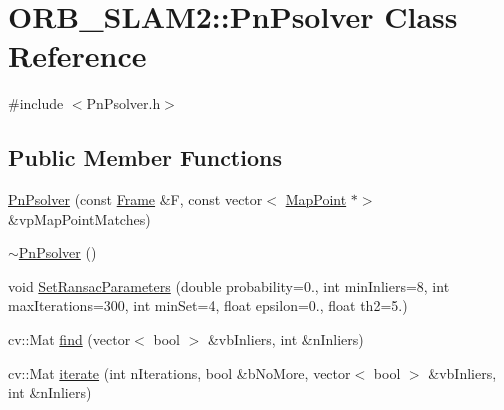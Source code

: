 \hypertarget{class_o_r_b___s_l_a_m2_1_1_pn_psolver}{}\section{O\+R\+B\+\_\+\+S\+L\+A\+M2\+:\+:Pn\+Psolver Class Reference}
\label{class_o_r_b___s_l_a_m2_1_1_pn_psolver}


{\ttfamily \#include $<$Pn\+Psolver.\+h$>$}

\subsection*{Public Member Functions}
\begin{DoxyCompactItemize}
\item 
\mbox{\hyperlink{class_o_r_b___s_l_a_m2_1_1_pn_psolver_a7b4cad992a43620e027bfb4bc9ef24f8}{Pn\+Psolver}} (const \mbox{\hyperlink{class_o_r_b___s_l_a_m2_1_1_frame}{Frame}} \&F, const vector$<$ \mbox{\hyperlink{class_o_r_b___s_l_a_m2_1_1_map_point}{Map\+Point}} $\ast$$>$ \&vp\+Map\+Point\+Matches)
\item 
\mbox{\hyperlink{class_o_r_b___s_l_a_m2_1_1_pn_psolver_ad40b921779ed92bfb6b017a76e4d88aa}{$\sim$\+Pn\+Psolver}} ()
\item 
void \mbox{\hyperlink{class_o_r_b___s_l_a_m2_1_1_pn_psolver_adff29377dcc77891a33113080b6b1eb7}{Set\+Ransac\+Parameters}} (double probability=0., int min\+Inliers=8, int max\+Iterations=300, int min\+Set=4, float epsilon=0., float th2=5.)
\item 
cv\+::\+Mat \mbox{\hyperlink{class_o_r_b___s_l_a_m2_1_1_pn_psolver_a784429037a79cb53923f4db181a4d115}{find}} (vector$<$ bool $>$ \&vb\+Inliers, int \&n\+Inliers)
\item 
cv\+::\+Mat \mbox{\hyperlink{class_o_r_b___s_l_a_m2_1_1_pn_psolver_abbef2ac776747661112246e85667f452}{iterate}} (int n\+Iterations, bool \&b\+No\+More, vector$<$ bool $>$ \&vb\+Inliers, int \&n\+Inliers)
\end{DoxyCompactItemize}

